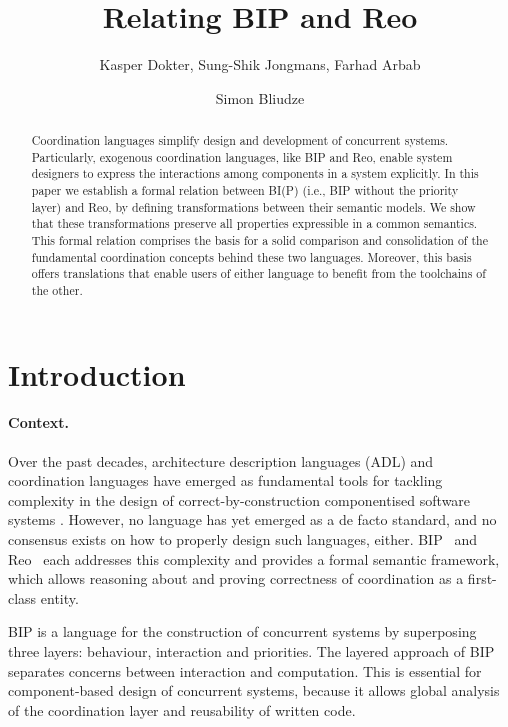 \documentclass[submission,copyright,creativecommons,hidelinks]{eptcs}
\title{Relating BIP and Reo}
\author{Kasper Dokter, Sung-Shik Jongmans, Farhad Arbab \\
\institute{Centrum Wiskunde \& Informatica, \\ Amsterdam, Netherlands}
\and
Simon Bliudze \\ 
\institute{\'Ecole Polytechnique F\'ed\'erale de Lausanne, \\ Lausanne, Switzerland}}
\theoremstyle{plain} \newtheorem{theorem}{Theorem}
\theoremstyle{definition}
\theoremstyle{remark}
\begin{document}
\maketitle

\begin{abstract}
Coordination languages simplify design and development of concurrent systems. 
Particularly, exogenous coordination languages, like BIP and Reo, enable system designers to express the interactions among components in a system explicitly. 
In this paper we establish a formal relation between BI(P) (i.e., BIP without the priority layer) and Reo, by defining transformations between their semantic models. 
We show that these transformations preserve all properties expressible in a common semantics. 
This formal relation comprises the basis for a solid comparison and consolidation of the fundamental coordination concepts behind these two languages. 
Moreover, this basis offers translations that enable users of either language to benefit from the toolchains of the other.
\end{abstract}

\raggedbottom

\section{Introduction}
\label{sec:intro}

\paragraph{Context.} 
Over the past decades, architecture description languages (ADL) and coordination languages have emerged as fundamental tools for tackling complexity in the design of correct-by-construction componentised software systems \cite{Garlan}. 
However, no language has yet emerged as a de facto standard, and no consensus exists on how to properly design such languages, either.  
BIP~\cite{bip06,BliSif07-acp-emsoft} and Reo~\cite{Reo} each addresses this complexity and provides a formal semantic framework, which allows reasoning about and proving correctness of coordination as a first-class entity.  

BIP is a language for the construction of concurrent systems by superposing three layers: behaviour, interaction and priorities.
The layered approach of BIP separates concerns between interaction and computation.
This is essential for component-based design of concurrent systems, because it allows global analysis of the coordination layer and reusability of written code.
\end{document}

